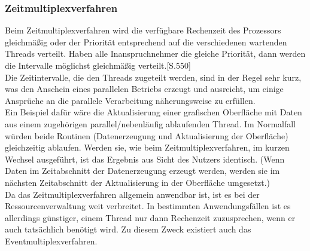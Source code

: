 \subsubsection{Zeitmultiplexverfahren}
Beim Zeitmultiplexverfahren wird die verfügbare Rechenzeit des Prozessors gleichmäßig oder der Priorität entsprechend auf die verschiedenen wartenden Threads verteilt. Haben alle Inanspruchnehmer die gleiche Priorität, dann werden die Intervalle möglichst gleichmäßig verteilt.\cite{Gumm_Einfurung}[S.550]\\
Die Zeitintervalle, die den Threads zugeteilt werden, sind in der Regel sehr kurz, was den Anschein eines parallelen Betriebs erzeugt und ausreicht, um einige Ansprüche an die parallele Verarbeitung näherungsweise zu erfüllen.\\
Ein Beispiel dafür wäre die Aktualisierung einer grafischen Oberfläche mit Daten aus einem zugehörigen parallel/nebenläufig ablaufenden Thread. Im Normalfall würden beide Routinen (Datenerzeugung und Aktualisierung der Oberfläche) gleichzeitig ablaufen. Werden sie, wie beim Zeitmultiplexverfahren, im kurzen Wechsel ausgeführt, ist das Ergebnis aus Sicht des Nutzers identisch. (Wenn Daten im Zeitabschnitt der Datenerzeugung erzeugt werden, werden sie im nächsten Zeitabschnitt der Aktualisierung in der Oberfläche umgesetzt.)\\
Da das Zeitmultiplexverfahren allgemein anwendbar ist, ist es bei der Ressourcenverwaltung weit verbreitet. In bestimmten Anwendungsfällen ist es allerdings günstiger, einem Thread nur dann Rechenzeit zuzusprechen, wenn er auch tatsächlich benötigt wird. Zu diesem Zweck existiert auch das Eventmultiplexverfahren.


